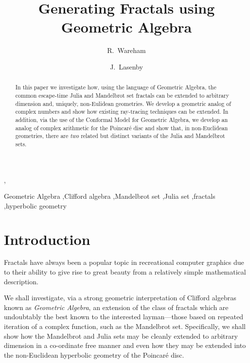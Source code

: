 \documentclass{elsart}
\theoremstyle{definition}
\begin{document}
\begin{frontmatter}
\title{Generating Fractals using Geometric Algebra}


\author{R.~Wareham},
\author{J.~Lasenby}

\address{Department~of~Engineering, University~of~Cambridge,\\Trumpington~Street,
Cambridge, CB2~1PZ, UK}

\begin{abstract}
In this paper we investigate how, using the language of 
Geometric Algebra\cite{siggraph,hestenes},
the common escape-time Julia and Mandelbrot set fractals can be extended to
arbitrary dimension and, uniquely, non-Eulidean geometries. We develop a
geometric analog of complex numbers and show how existing ray-tracing
techniques\cite{FRAC:HypercomplexIterations} can be extended. In addition,
via the use of the Conformal Model for Geometric Algebra, we develop an analog
of complex arithmetic for the Poincar\'e disc and show that, in non-Euclidean
geometries, there are \emph{two} related but distinct variants of the Julia
and Mandelbrot sets.

\end{abstract}

\begin{keyword}
Geometric Algebra \sep Clifford algebra \sep Mandelbrot set
\sep Julia set \sep fractals \sep hyperbolic geometry

\end{keyword}
\end{frontmatter}

\section{Introduction}

Fractals have always been a popular topic in recreational computer graphics due
to their ability to give rise to great beauty from a relatively
simple mathematical description.

We shall investigate, via a strong geometric interpretation of Clifford
algebras known as \emph{Geometric Algebra}\cite{siggraph,hestenes,WarehamThesis}, an
extension  of the class of fractals which are undoubtably the best known to the
interested layman---those based on repeated iteration of a complex function,
such as the Mandelbrot set.  Specifically, we shall show how the Mandelbrot and
Julia sets may be cleanly extended to arbitrary dimension in a co-ordinate free
manner and even how they may be extended into the non-Euclidean hyperbolic
geometry of the Poincar\'e disc.
\end{document}
